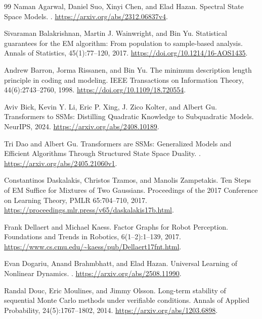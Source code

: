 \documentclass[11pt,twoside]{article}
\theoremstyle{definition}
\theoremstyle{remark}
\begin{document}
\clearpage
\begin{thebibliography}{99}
Naman Agarwal, Daniel Suo, Xinyi Chen, and Elad Hazan.
\newblock Spectral State Space Models.
. \url{https://arxiv.org/abs/2312.06837v4}.

Sivaraman Balakrishnan, Martin J. Wainwright, and Bin Yu.
\newblock Statistical guarantees for the EM algorithm: From population to
sample-based analysis.
\newblock Annals of Statistics, 45(1):77--120, 2017.
\newblock \url{https://doi.org/10.1214/16-AOS1435}.

Andrew Barron, Jorma Rissanen, and Bin Yu.
\newblock The minimum description length principle in coding and modeling.
\newblock IEEE Transactions on Information Theory, 44(6):2743--2760, 1998.
\newblock \url{https://doi.org/10.1109/18.720554}.

Aviv Bick, Kevin Y. Li, Eric P. Xing, J. Zico Kolter, and Albert Gu.
\newblock Transformers to SSMs: Distilling Quadratic Knowledge to Subquadratic Models.
\newblock NeurIPS, 2024. \url{https://arxiv.org/abs/2408.10189}.

Tri Dao and Albert Gu.
\newblock Transformers are SSMs: Generalized Models and Efficient Algorithms
Through Structured State Space Duality.
. \url{https://arxiv.org/abs/2405.21060v1}.

Constantinos Daskalakis, Christos Tzamos, and Manolis Zampetakis.
\newblock Ten Steps of EM Suffice for Mixtures of Two Gaussians.
\newblock Proceedings of the 2017 Conference on Learning Theory,
PMLR 65:704--710, 2017.
\newblock \url{https://proceedings.mlr.press/v65/daskalakis17b.html}.

Frank Dellaert and Michael Kaess.
\newblock Factor Graphs for Robot Perception.
\newblock Foundations and Trends in Robotics, 6(1--2):1--139, 2017.
\newblock \url{https://www.cs.cmu.edu/~kaess/pub/Dellaert17fnt.html}.

Evan Dogariu, Anand Brahmbhatt, and Elad Hazan.
\newblock Universal Learning of Nonlinear Dynamics.
. \url{https://arxiv.org/abs/2508.11990}.

Randal Douc, Eric Moulines, and Jimmy Olsson.
\newblock Long-term stability of sequential Monte Carlo methods under verifiable conditions.
\newblock Annals of Applied Probability, 24(5):1767--1802, 2014.
\newblock \url{https://arxiv.org/abs/1203.6898}.


\end{thebibliography}
\end{document}

